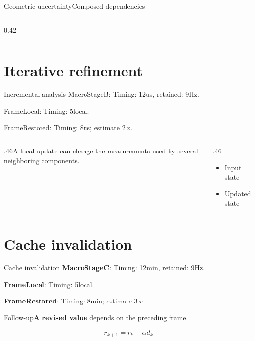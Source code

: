 \documentclass[9pt,aspectratio=43]{beamer}
\newcommand{\fuzzlayerA}[1]{\textrm{#1}}
\newcommand{\fuzzlayerB}[1]{\fuzzlayerA{#1}}
\newcommand{\fuzzlayerC}[1]{\fuzzlayerB{#1}}
\newcommand{\fuzzterm}[1]{\fuzzlayerC{#1}}
\newcommand{\fuzzpair}[2]{\fuzzterm{#1}: #2}
\newcommand{\fuzzunit}{Hz}
\let\fuzzoriginalunit\fuzzunit
\newcommand{\fuzzcoefficient}{2}
\newcommand{\fuzzscale}[2][\fuzzcoefficient]{#1\,#2}
\begin{document}
\begin{frame}[t,shrink=5]{Geometric uncertainty}{Composed dependencies}
\begin{columns}[onlytextwidth,c]
\begin{column}{0.42\textwidth}
\begin{description}
\end{description}
\end{column}
\end{columns}
\par {}
\end{frame}
\renewcommand{\fuzzunit}{us}
\renewcommand{\fuzzcoefficient}{2}
\renewcommand{\fuzzterm}[1]{{\textrm{#1}}}
\section{Iterative refinement}
\begin{frame}[t]{Incremental analysis}
\fuzzpair{MacroStageB}{Timing: 12\fuzzunit, retained: 9\fuzzoriginalunit.}\par
{\renewcommand{\fuzzunit}{local}\fuzzpair{FrameLocal}{Timing: 5\fuzzunit.}\par}
\fuzzpair{FrameRestored}{Timing: 8\fuzzunit; estimate $\fuzzscale{x}$.}\par
\begin{columns}[T]\begin{column}{.46\textwidth}A local update can change the measurements used by several neighboring components.\end{column}\begin{column}{.46\textwidth}\begin{itemize}\item Input state\item Updated state\end{itemize}\end{column}\end{columns}
\end{frame}
\renewcommand{\fuzzunit}{min}
\renewcommand{\fuzzcoefficient}{3}
\renewcommand{\fuzzterm}[1]{{\textbf{#1}}}
\section{Cache invalidation}
\begin{frame}[t]{Cache invalidation}
\fuzzpair{MacroStageC}{Timing: 12\fuzzunit, retained: 9\fuzzoriginalunit.}\par
{\renewcommand{\fuzzunit}{local}\fuzzpair{FrameLocal}{Timing: 5\fuzzunit.}\par}
\fuzzpair{FrameRestored}{Timing: 8\fuzzunit; estimate $\fuzzscale{x}$.}\par
\begin{block}{Follow-up}\fuzzterm{A revised value} depends on the preceding frame.\end{block}
\[r_{k+1}=r_k-\alpha d_k\]
\end{frame}
\renewcommand{\fuzzunit}{Hz}
\renewcommand{\fuzzcoefficient}{4}
\renewcommand{\fuzzterm}[1]{{\textbf{#1}}}
\end{document}

